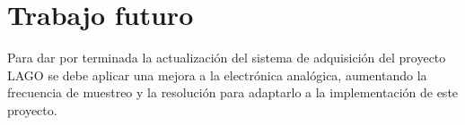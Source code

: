 
\chapter{Trabajo futuro}

Para dar por terminada la actualización del sistema de adquisición del proyecto LAGO se debe aplicar una mejora a la electrónica analógica, aumentando la frecuencia de muestreo y la resolución para adaptarlo a la implementación de este proyecto.


